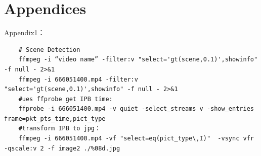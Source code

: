 \documentclass[12pt]{article}
\begin{document}
\clearpage

\section*{Appendices}
	\noindent Appendix1：
	\begin{lstlisting}
	# Scene Detection
	ffmpeg -i “video name” -filter:v "select='gt(scene,0.1)',showinfo" -f null - 2>&1
	ffmpeg -i 666051400.mp4 -filter:v "select='gt(scene,0.1)',showinfo" -f null - 2>&1
	#ues ffprobe get IPB time:
	ffprobe -i 666051400.mp4 -v quiet -select_streams v -show_entries frame=pkt_pts_time,pict_type
	#transform IPB to jpg：
	ffmpeg -i 666051400.mp4 -vf "select=eq(pict_type\,I)"  -vsync vfr -qscale:v 2 -f image2 ./%08d.jpg
	\end{lstlisting}
	
	

\end{document}

